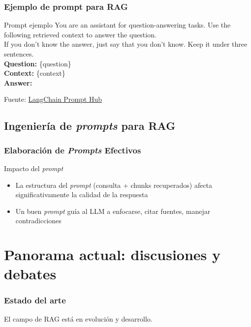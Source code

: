 \documentclass[handout]{beamer}
\begin{document}
\begin{frame}
  \frametitle{Ejemplo de prompt para RAG}
  \begin{block}{Prompt ejemplo}
    \footnotesize\ttfamily
    You are an assistant for question-answering tasks. Use the following retrieved context to answer the question.\\
    If you don’t know the answer, just say that you don’t know. Keep it under three sentences.\\[0.5em]
    \textbf{Question:} \{question\}\\
    \textbf{Context:} \{context\}\\
    \textbf{Answer:}
    \normalfont
  \end{block}
  \vspace{0.5em}
  \raggedleft
  \small{Fuente: \href{https://smith.langchain.com/hub/rlm/rag-prompt}{LangChain Prompt Hub}}
\end{frame}


\subsection{Ingeniería de \textit{prompts} para RAG}
\begin{frame}
  \frametitle{Elaboración de \textit{Prompts} Efectivos}
    \begin{block}{Impacto del \textit{prompt}}
        \begin{itemize}
            \item La estructura del \textit{prompt} (consulta + chunks recuperados) afecta significativamente la calidad de la respuesta
            \item Un buen \textit{prompt} guía al LLM a enfocarse, citar fuentes, manejar contradicciones \parencite{Zhang2024Towards}
        \end{itemize}
    \end{block}
\end{frame}

\section{Panorama actual: discusiones y debates}
\begin{frame}
    \frametitle{Estado del arte}
    El campo de RAG está en evolución y desarrollo.
\end{frame}
\end{document}
